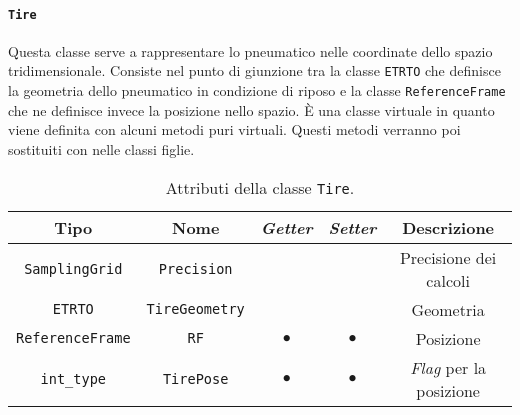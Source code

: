 \paragraph{\texttt{Tire}}
Questa classe serve a rappresentare lo pneumatico nelle coordinate dello spazio tridimensionale. Consiste nel punto di giunzione tra la classe \texttt{ETRTO} che definisce la geometria dello pneumatico in condizione di riposo e la classe \texttt{ReferenceFrame} che ne definisce invece la posizione nello spazio. È una classe virtuale in quanto viene definita con alcuni metodi puri virtuali. Questi metodi verranno poi sostituiti con nelle classi figlie.
\begin{table}[h!]
	\centering
	\begin{tabular}{|c|c|c|c|c|}
		\hline 
		\textbf{Tipo} & \textbf{Nome} & \textit{\textbf{Getter}} & \textit{\textbf{Setter}} & \textbf{Descrizione} \\ \hline 
		\texttt{SamplingGrid} & \texttt{Precision} & & & Precisione dei calcoli \\ \hline 
		\texttt{ETRTO} & \texttt{TireGeometry} & & & Geometria \\ \hline 
		\texttt{ReferenceFrame} & \texttt{RF} & $\bullet$ & $\bullet$ & Posizione \\ \hline
		\texttt{int\_type} & \texttt{TirePose} & $\bullet$ & $\bullet$ & \textit{Flag} per la posizione \\ \hline
	\end{tabular}
	\caption{Attributi della classe \texttt{Tire}.}
	\label{}
\end{table}
%
